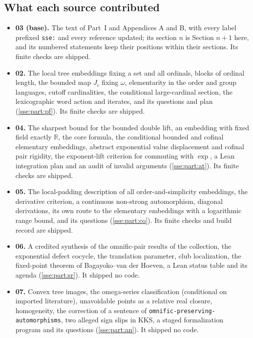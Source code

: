 \documentclass[11pt,a4paper]{article}
\numberwithin{equation}{section}
\theoremstyle{plain}
\theoremstyle{definition}
\theoremstyle{remark}
\newcommand{\R}{\mathbb{R}}
\newcommand{\lbl}[1]{\nolinkurl{#1}}%
\newcommand{\fn}[1]{\nolinkurl{#1}}%
\begin{document}
\subsection{What each source contributed}
\begin{itemize}
\item \textbf{03 (base).} The text of Part~I and Appendices A and B, with
every label prefixed \lbl{sse:} and every reference updated; its section
$n$ is Section $n+1$ here, and its numbered statements keep their positions
within their sections. Its finite checks are shipped.
\item \textbf{02.} The local tree embeddings fixing a set and all ordinals,
blocks of ordinal length, the bounded map $J_c$ fixing $\omega$, elementarity
in the order and group languages, cutoff cardinalities, the conditional
large-cardinal section, the lexicographic word action and iterates, and its
questions and plan (\cref{sse:part:pf}). Its finite checks are shipped.
\item \textbf{04.} The sharpest bound for the bounded double lift, an
embedding with fixed field exactly $\R$, the core formula, the conditional
bounded and cofinal elementary embeddings, abstract exponential value
displacement and cofinal pair rigidity, the exponent-lift criterion for
commuting with $\exp$, a Lean integration plan and an audit of invalid
arguments (\cref{sse:part:at}). Its finite checks are shipped.
\item \textbf{05.} The local-padding description of all order-and-simplicity
embeddings, the derivative criterion, a continuous non-strong automorphism,
diagonal derivations, its own route to the elementary embeddings with a
logarithmic range bound, and its questions (\cref{sse:part:co}). Its finite
checks and build record are shipped.
\item \textbf{06.} A credited synthesis of the omnific-pair results of the
collection, the exponential defect cocycle, the translation parameter, club
localization, the fixed-point theorem of Bagayoko--van der Hoeven, a Lean
status table and its agenda (\cref{sse:part:sr}). It shipped no code.
\item \textbf{07.} Convex tree images, the omega-series classification
(conditional on imported literature), unavoidable points as a relative real
closure, homogeneity, the correction of a sentence of
\fn{omnific-preserving-automorphisms}, two alleged sign slips in KKS, a staged
formalization program and its questions (\cref{sse:part:an}). It shipped no
code.
\end{itemize}
\end{document}
